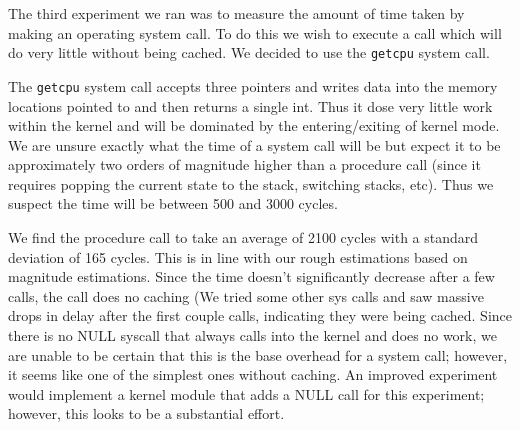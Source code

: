 The third experiment we ran was to measure the amount of time taken by making an operating system call.
To do this we wish to execute a call which will do very little without being cached.  
We decided to use the {\tt getcpu} system call.

The {\tt getcpu} system call accepts three pointers and writes data into the memory locations pointed to and then returns a single int.
Thus it dose very little work within the kernel and will be dominated by the entering/exiting of kernel mode.
We are unsure exactly what the time of a system call will be but expect it to be approximately two orders of magnitude higher than a procedure call (since it requires popping the current state to the stack, switching stacks, etc).
Thus we suspect the time will be between 500 and 3000 cycles.

We find the procedure call to take an average of 2100 cycles with a standard deviation of 165 cycles.
This is in line with our rough estimations based on magnitude estimations.
Since the time doesn't significantly decrease after a few calls, the call does no caching (We tried some other sys calls and saw massive drops in delay after the first couple calls, indicating they were being cached.
Since there is no NULL syscall that always calls into the kernel and does no work,  we are unable to be certain that this is the base overhead for a system call; however, it seems like one of the simplest ones without caching.
An improved experiment would implement a kernel module that adds a NULL call for this experiment; however, this looks to be a substantial effort.